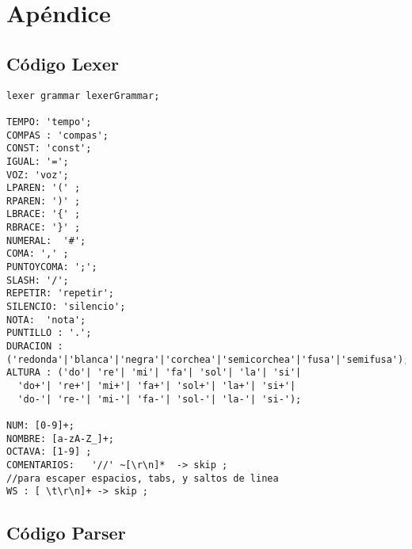 \section{Apéndice}

\subsection{Código Lexer}
\begin{verbatim}
lexer grammar lexerGrammar;

TEMPO: 'tempo';
COMPAS : 'compas';
CONST: 'const';
IGUAL: '=';
VOZ: 'voz';
LPAREN: '(' ;
RPAREN: ')' ;
LBRACE: '{' ;
RBRACE: '}' ;
NUMERAL:  '#';
COMA: ',' ;
PUNTOYCOMA: ';';
SLASH: '/';
REPETIR: 'repetir';
SILENCIO: 'silencio';
NOTA:  'nota';
PUNTILLO : '.';
DURACION : ('redonda'|'blanca'|'negra'|'corchea'|'semicorchea'|'fusa'|'semifusa');
ALTURA : ('do'| 're'| 'mi'| 'fa'| 'sol'| 'la'| 'si'|
  'do+'| 're+'| 'mi+'| 'fa+'| 'sol+'| 'la+'| 'si+'|
  'do-'| 're-'| 'mi-'| 'fa-'| 'sol-'| 'la-'| 'si-');

NUM: [0-9]+;
NOMBRE: [a-zA-Z_]+;
OCTAVA: [1-9] ;
COMENTARIOS:   '//' ~[\r\n]*  -> skip ;
//para escaper espacios, tabs, y saltos de linea
WS : [ \t\r\n]+ -> skip ;
\end{verbatim}

\subsection{Código Parser}

